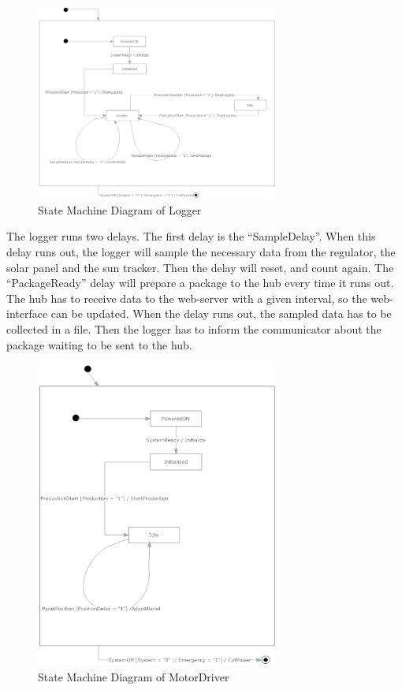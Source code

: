 \documentclass[12pt,a4paper]{report}
\begin{document}
\begin{figure}[htbp]
\centering
\includegraphics[width=8cm]{images/LoggerUML}
\caption{State Machine Diagram of Logger}
\label{fig:LoggerUML}
\end{figure}


The logger runs two delays. The first delay is the “SampleDelay”. When this delay runs out, the logger will sample the necessary data from the regulator, the solar panel and the sun tracker. Then the delay will reset, and count again. The “PackageReady” delay will prepare a package to the hub every time it runs out. The hub has to receive data to the web-server with a given interval, so the web-interface can be updated. When the delay runs out, the sampled data has to be collected in a file. Then the logger has to inform the communicator about the package waiting to be sent to the hub.

\begin{figure}[htbp]
\centering
\includegraphics[width=8cm]{images/MotorDriverUML}
\caption{State Machine Diagram of MotorDriver}
\label{fig:MotorDriverUML}
\end{figure}
\end{document}
